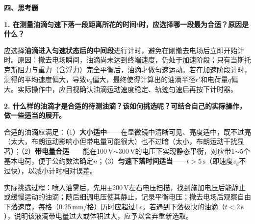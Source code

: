 \documentclass[a4paper,12pt]{article}
\begin{document}
\vspace{0.3cm}

{\fontsize{12pt}{18pt}\selectfont

\underline{\hspace{\textwidth}}

\vspace{0.5em}
\underline{\hspace{\textwidth}}

}

\newpage

{\fontsize{16pt}{24pt}\selectfont \textbf{四、思考题}}

\vspace{0.5cm}

{\fontsize{12pt}{18pt}\selectfont

\textbf{1. 在测量油滴匀速下落一段距离所花的时间$t$时，应选择哪一段最为合适？原因是什么？}

\vspace{0.2cm}

应选择\textbf{油滴进入匀速状态后的中间段}进行计时，避免在刚撤去电场后立即开始计时。原因：撤去电场瞬间，油滴尚未达到终端速度，仍处于加速阶段；只有当斯托克斯阻力与重力（含浮力）完全平衡后，油滴才做匀速运动。若在加速阶段计时，测得的平均速度偏大，导致$v_g$偏大，最终使得计算出的油滴半径$r'$和电荷量$q$偏大。实际操作中，应目视确认油滴运动速度稳定、轨迹匀速后再按下计时器。

\vspace{0.5cm}

\textbf{2. 什么样的油滴才是合适的待测油滴？该如何挑选呢？可结合自己的实际操作，做一些适当的展开。}

\vspace{0.2cm}

合适的油滴应满足：（1）\textbf{大小适中}——在显微镜中清晰可见、亮度适中，既不过亮（太大，布朗运动影响小但带电量可能很大）也不过暗（太小，布朗运动干扰显著）；（2）\textbf{带电量合适}——能在100\,V$\sim$300\,V的电压下实现静态平衡，对应带1$\sim$5个基本电荷，便于公约数法确定$n$；（3）\textbf{匀速下落时间适当}——$t > 5\,\text{s}$（即速度$v_g$不过快），以减小计时相对误差。

实际挑选过程：喷入油雾后，先用$\pm$200\,V左右电压扫描，找到施加电压后能静止或缓慢运动的油滴；随后细调电压使其静止，记录平衡电压；撤去电场后观察自由下落速度，每格（0.25\,mm/格）历时应超过1\,s。若遇到下落极快的油滴（$t < 2\,\text{s}$），说明该液滴带电量过大或体积过大，应予以舍弃重新选取。

}
\end{document}
